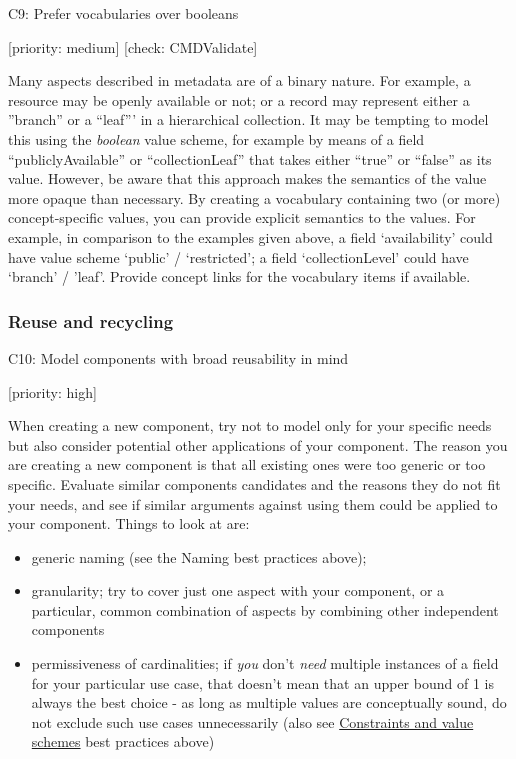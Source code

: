 C9: Prefer vocabularies over booleans

{[}priority: medium{]} {[}check: CMDValidate{]}

Many aspects described in metadata are of a binary nature. For example,
a resource may be openly available or not; or a record may represent
either a ''branch'' or a ``leaf''' in a hierarchical collection. It may
be tempting to model this using the \emph{boolean} value scheme, for
example by means of a field ``publiclyAvailable'' or ``collectionLeaf''
that takes either ``true'' or ``false'' as its value. However, be aware
that this approach makes the semantics of the value more opaque than
necessary. By creating a vocabulary containing two (or more)
concept-specific values, you can provide explicit semantics to the
values. For example, in comparison to the examples given above, a field
`availability' could have value scheme `public' / `restricted'; a field
`collectionLevel' could have `branch' / 'leaf'. Provide concept links
for the vocabulary items if available.

\subsubsection{Reuse and recycling}\label{reuse-and-recycling}

C10: Model components with broad reusability in mind

{[}priority: high{]}

When creating a new component, try not to model only for your specific
needs but also consider potential other applications of your component.
The reason you are creating a new component is that all existing ones
were too generic or too specific. Evaluate similar components candidates
and the reasons they do not fit your needs, and see if similar arguments
against using them could be applied to your component. Things to look at
are:

\begin{itemize}
\tightlist
\item
  generic naming (see the Naming best practices above);
\item
  granularity; try to cover just one aspect with your component, or a
  particular, common combination of aspects by combining other
  independent components
\item
  permissiveness of cardinalities; if \emph{you} don't \emph{need}
  multiple instances of a field for your particular use case, that
  doesn't mean that an upper bound of 1 is always the best choice - as
  long as multiple values are conceptually sound, do not exclude such
  use cases unnecessarily (also see
  \protect\hyperlink{constraints-and-value-schemes}{Constraints and
  value schemes} best practices above)
\end{itemize}

